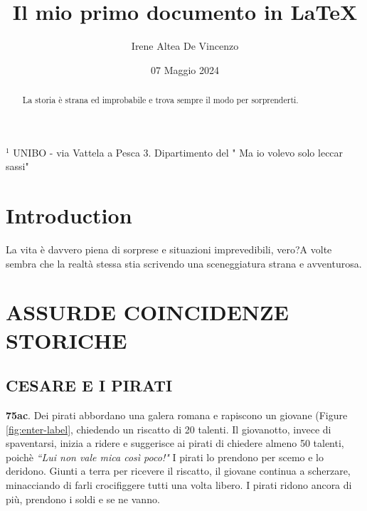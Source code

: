 \documentclass[a4paper, 12pt]{article} %
\title{Il mio primo documento in LaTeX} %
\author{Irene Altea De Vincenzo} %
\date{07 Maggio 2024} %
\begin{document}

\maketitle %
\nolinenumbers %

$^1$ UNIBO - via Vattela a Pesca 3. Dipartimento del " Ma io volevo solo leccar sassi"

\tableofcontents %

\begin{abstract} %
La storia è strana ed improbabile e trova sempre il modo per sorprenderti.  
\end{abstract} %

\section{Introduction} %
\tb La vita è davvero piena di sorprese e situazioni imprevedibili, vero?A volte sembra che la realtà stessa stia scrivendo una sceneggiatura strana e avventurosa.

\section{ASSURDE COINCIDENZE STORICHE}
\subsection{CESARE E I PIRATI} %
\textbf{75ac}. Dei pirati abbordano una galera romana e rapiscono un giovane (Figure \ref{fig:enter-label}, chiedendo un riscatto di 20 talenti.
Il giovanotto, invece di spaventarsi, inizia a ridere e suggerisce ai pirati di chiedere almeno 50 talenti, poichè \textit{“Lui non vale mica così poco!"} 
I pirati lo prendono per scemo e lo deridono.
Giunti a terra per ricevere il riscatto, il giovane continua a scherzare, minacciando di farli crocifiggere tutti una volta libero. I pirati ridono ancora di più, prendono i soldi e se ne vanno.
\end{document}
